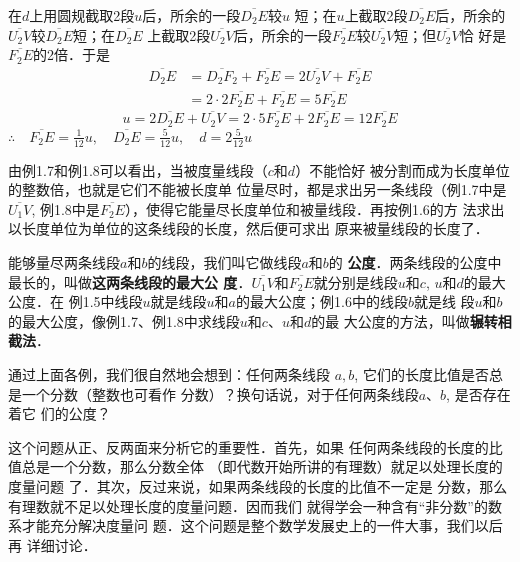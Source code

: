\begin{solution}
	在$d$上用圆规截取2段$u$后，所余的一段$\overline{D_2E}$较$u$
短；在$u$上截取2段$\overline{D_2E}$后，所余的$\overline{U_2V}$较$\overline{D_2E}$短；在$\overline{D_2E}$
上截取2段$\overline{U_2V}$后，所余的一段$\overline{F_2E}$较$\overline{U_2V}$短；但$\overline{U_2V}$恰
好是$\overline{F_2E}$的2倍．于是
\[\begin{split}
	\overline{D_2E}&=\overline{D_2F_2}+\overline{F_2E}=2\overline{U_2V}+\overline{F_2E}\\
&=2\cdot 2\overline{F_2E}+\overline{F_2E}=5\overline{F_2E}
\end{split}\]
\[u=2\overline{D_2E}+\overline{U_2V}=2\cdot 5\overline{F_2E}+2\overline{F_2E}=12\overline{F_2E}\]
$\therefore\quad \overline{F_2E}=\frac{1}{12}u,\quad \overline{D_2E}=\frac{5}{12}u,\quad d=2\frac{5}{12}u$
\end{solution}


由例1.7和例1.8可以看出，当被度量线段（$c$和$d$）不能恰好
被分割而成为长度单位的整数倍，也就是它们不能被长度单
位量尽时，都是求出另一条线段（例1.7中是$\overline{U_1V}$, 例1.8中是$\overline{F_2E}$），使得它能量尽长度单位和被量线段．再按例1.6的方
法求出以长度单位为单位的这条线段的长度，然后便可求出
原来被量线段的长度了．

能够量尽两条线段$a$和$b$的线段，我们叫它做线段$a$和$b$的
\textbf{公度}．两条线段的公度中最长的，叫做\textbf{这两条线段的最大公
度}．$\overline{U_1V}$和$\overline{F_2E}$就分别是线段$u$和$c$, $u$和$d$的最大公度．在
例1.5中线段$u$就是线段$u$和$a$的最大公度；例1.6中的线段$b$就是线
段$u$和$b$的最大公度，像例1.7、例1.8中求线段$u$和$c$、$u$和$d$的最
大公度的方法，叫做\textbf{辗转相截法}．

通过上面各例，我们很自然地会想到：任何两条线段
$a, b$, 它们的长度比值是否总是一个分数（整数也可看作
分数）？换句话说，对于任何两条线段$a$、$b$, 是否存在着它
们的公度？

这个问题从正、反两面来分析它的重要性．首先，如果
任何两条线段的长度的比值总是一个分数，那么分数全体
（即代数开始所讲的有理数）就足以处理长度的度量问题
了．其次，反过来说，如果两条线段的长度的比值不一定是
分数，那么有理数就不足以处理长度的度量问题．因而我们
就得学会一种含有“非分数”的数系才能充分解决度量问
题．这个问题是整个数学发展史上的一件大事，我们以后再
详细讨论．

